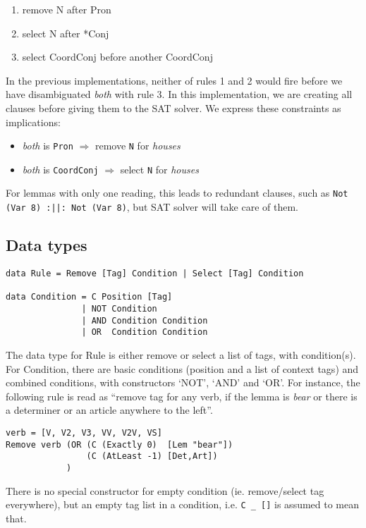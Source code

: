 \documentclass[a4paper, 11pt]{article}
\begin{document}
\begin{enumerate}
\item remove N after Pron
\item select N after *Conj
\item select CoordConj before another CoordConj
\end{enumerate}

In the previous implementations, neither of rules 1 and 2 would fire
before we have disambiguated \emph{both} with rule 3.
In this implementation, we are creating all clauses before giving
them to the SAT solver. We express these constraints as implications:
\begin{itemize}
\item \emph{both} is \texttt{Pron} $\Rightarrow$ remove \texttt{N} for \emph{houses}
\item \emph{both} is \texttt{CoordConj} $\Rightarrow$ select
  \texttt{N} for \emph{houses}
\end{itemize}

For lemmas with only one reading, this leads to redundant clauses,
such as \texttt{Not (Var 8) :||: Not (Var 8)}, but SAT solver will
take care of them.

\subsection{Data types}

\begin{lstlisting}
data Rule = Remove [Tag] Condition | Select [Tag] Condition

data Condition = C Position [Tag]
               | NOT Condition
               | AND Condition Condition
               | OR  Condition Condition 
\end{lstlisting}

The data type for Rule is either remove or select a list of tags, with condition(s).
For Condition, there are basic conditions (position and a list of context tags) and combined conditions, with constructors `NOT', `AND' and `OR'. For instance, the following rule is read as ``remove tag for any verb, if the lemma is \emph{bear} or there is a determiner or an article anywhere to the left''.

\begin{lstlisting}
verb = [V, V2, V3, VV, V2V, VS]
Remove verb (OR (C (Exactly 0)  [Lem "bear"])
                (C (AtLeast -1) [Det,Art])
            )
\end{lstlisting}

There is no special constructor for empty condition (ie. remove/select tag everywhere), but an empty tag list in a condition, i.e. \texttt{C \_ []} is assumed to mean that.
\end{document}
